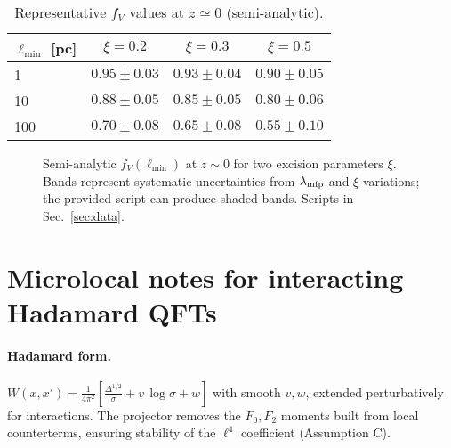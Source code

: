 \documentclass[aps,prd,onecolumn,superscriptaddress,nofootinbib]{revtex4-2}
\begin{document}
\begin{table}[b]
\centering
\caption{Representative \(f_V\) values at \(z\simeq 0\) (semi-analytic).}
\label{tab:fV}
\begin{tabular}{lccc}
\toprule
\(\ell_{\min}\) [pc] & \(\xi=0.2\) & \(\xi=0.3\) & \(\xi=0.5\) \\
\midrule
1   & \(0.95\pm0.03\) & \(0.93\pm0.04\) & \(0.90\pm0.05\) \\
10  & \(0.88\pm0.05\) & \(0.85\pm0.05\) & \(0.80\pm0.06\) \\
100 & \(0.70\pm0.08\) & \(0.65\pm0.08\) & \(0.55\pm0.10\) \\
\bottomrule
\end{tabular}
\end{table}

\begin{figure}[t]
\centering
{}
\caption{Semi-analytic \(f_V(\ell_{\min})\) at \(z\!\sim\!0\) for two excision parameters \(\xi\). Bands represent systematic uncertainties from \(\lambda_{\rm mfp}\) and \(\xi\) variations; the provided script can produce shaded bands. Scripts in Sec.~\ref{sec:data}.}
\label{fig:fV}
\end{figure}

\section{Microlocal notes for interacting Hadamard QFTs}
\label{app:microlocal}
\paragraph{Hadamard form.}
\(W(x,x')=\frac{1}{4\pi^2}\left[\frac{\Delta^{\!1/2}}{\sigma}+v\,\log\sigma+w\right]\) with smooth \(v,w\), extended perturbatively for interactions. The projector removes the \(F_0,F_2\) moments built from local counterterms, ensuring stability of the \(\ell^4\) coefficient (Assumption C).
\end{document}
